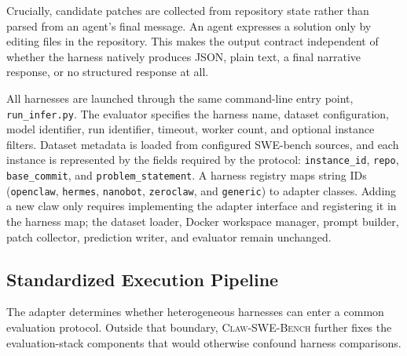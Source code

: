 \documentclass{llmxive}
\begin{document}
Crucially, candidate patches are collected from repository state rather than parsed from an agent's final message. An agent expresses a solution only by editing files in the repository. This makes the output contract independent of whether the harness natively produces JSON, plain text, a final narrative response, or no structured response at all.

All harnesses are launched through the same command-line entry point, \texttt{run\_infer.py}. The evaluator specifies the harness name, dataset configuration, model identifier, run identifier, timeout, worker count, and optional instance filters. Dataset metadata is loaded from configured SWE-bench sources, and each instance is represented by the fields required by the protocol: \texttt{instance\_id}, \texttt{repo}, \texttt{base\_commit}, and \texttt{problem\_statement}. A harness registry maps string IDs (\texttt{openclaw}, \texttt{hermes}, \texttt{nanobot}, \texttt{zeroclaw}, and \texttt{generic}) to adapter classes. Adding a new claw only requires implementing the adapter interface and registering it in the harness map; the dataset loader, Docker workspace manager, prompt builder, patch collector, prediction writer, and evaluator remain unchanged.

\subsection{Standardized Execution Pipeline}
\label{sec:exec_pipeline}

The adapter determines whether heterogeneous harnesses can enter a common evaluation protocol. Outside that boundary, \textsc{Claw-SWE-Bench} further fixes the evaluation-stack components that would otherwise confound harness comparisons.
\end{document}
